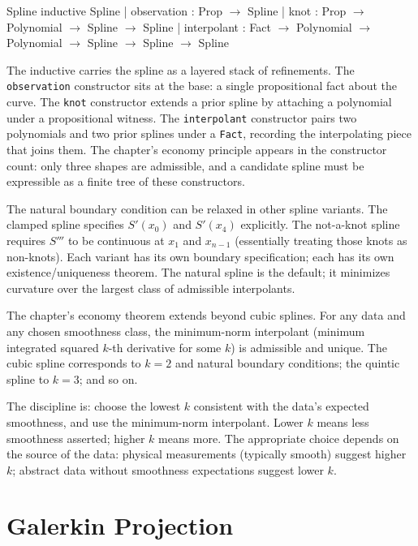 \begin{leanexcerpt}{Spline}
inductive Spline
  | observation : Prop $\to$ Spline
  | knot        : Prop $\to$ Polynomial $\to$ Spline $\to$ Spline
  | interpolant : Fact $\to$ Polynomial $\to$ Polynomial
                $\to$ Spline $\to$ Spline $\to$ Spline
\end{leanexcerpt}

The inductive carries the spline as a layered stack of refinements.
The \texttt{observation} constructor sits at the base: a single
propositional fact about the curve. The \texttt{knot} constructor
extends a prior spline by attaching a polynomial under a
propositional witness. The \texttt{interpolant} constructor pairs
two polynomials and two prior splines under a \texttt{Fact},
recording the interpolating piece that joins them. The chapter's
economy principle appears in the constructor count: only three
shapes are admissible, and a candidate spline must be expressible
as a finite tree of these constructors.

The natural boundary condition can be relaxed in other spline
variants. The clamped spline specifies $S'(x_0)$ and $S'(x_4)$
explicitly. The not-a-knot spline requires $S'''$ to be continuous
at $x_1$ and $x_{n-1}$ (essentially treating those knots as
non-knots). Each variant has its own boundary specification; each
has its own existence/uniqueness theorem. The natural spline is
the default; it minimizes curvature over the largest class of
admissible interpolants.

The chapter's economy theorem extends beyond cubic splines. For any
data and any chosen smoothness class, the minimum-norm interpolant
(minimum integrated squared $k$-th derivative for some $k$) is
admissible and unique. The cubic spline corresponds to $k = 2$
and natural boundary conditions; the quintic spline to $k = 3$;
and so on.

The discipline is: choose the lowest $k$ consistent with the data's
expected smoothness, and use the minimum-norm interpolant. Lower $k$
means less smoothness asserted; higher $k$ means more. The
appropriate choice depends on the source of the data: physical
measurements (typically smooth) suggest higher $k$; abstract
data without smoothness expectations suggest lower $k$.

\section{Galerkin Projection}
\label{se:galerkin-projection}

